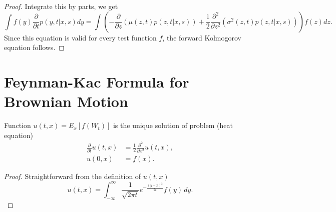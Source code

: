 \begin{proof}
Integrate this by parts, we get
\[
  \int f(y) \frac{\partial}{\partial t} p(y,t|x,s) dy  
  = \int \left( - \frac{\partial}{\partial z} (\mu(z,t)p(z,t|x,s))
    + \frac{1}{2} \frac{\partial^2}{\partial z^2} (\sigma^2(z,t)p(z,t|x,s))
    \right) f(z) dz.
\]
Since this equation is valid for every test function $f$, the forward Kolmogorov
equation follows.
\end{proof}
  









\section{Feynman-Kac Formula for Brownian Motion}

\begin{lemma} \label{L:heat}
Function $u(t,x)=E_x\left[f(W_t) \right]$ is the unique solution of problem
(heat equation)
\begin{align}
  \frac{\partial}{\partial t} u(t,x) 
    &= \frac{1}{2} \frac{\partial^2}{\partial x^2} u(t,x),  \\
  u(0,x) &= f(x).
\end{align}
\end{lemma}
\begin{proof}
Straightforward from the definition of $u(t,x)$
\[
  u(t,x) = \int_{-\infty}^{\infty} \frac{1}{\sqrt{2\pi t}}
           e^{-\frac{(y-x)^2}{2t}} f(y) \, dy.
\]
\end{proof}

